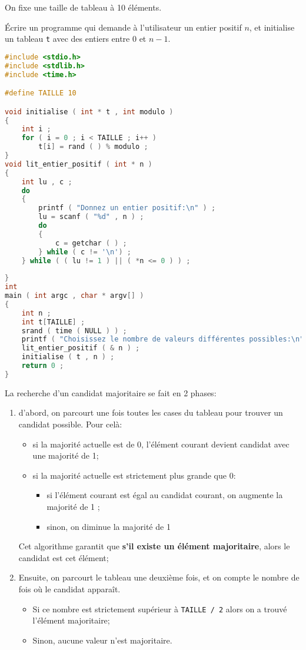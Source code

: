 On fixe une taille de tableau à 10 éléments.


\question Écrire un programme qui demande à l'utilisateur un entier
positif \(n\), et initialise un tableau \texttt{t} avec des entiers
entre \(0\) et \(n-1\).

\begin{solutioncachee}
  \begin{lstlisting}[language=C]
#include <stdio.h>
#include <stdlib.h>
#include <time.h>

#define TAILLE 10

void initialise ( int * t , int modulo )
{
    int i ;
    for ( i = 0 ; i < TAILLE ; i++ )
        t[i] = rand ( ) % modulo ;
}
void lit_entier_positif ( int * n )
{
    int lu , c ;
    do
    {
        printf ( "Donnez un entier positif:\n" ) ;
        lu = scanf ( "%d" , n ) ;
        do
        {
            c = getchar ( ) ;
        } while ( c != '\n') ;
    } while ( ( lu != 1 ) || ( *n <= 0 ) ) ;
    
}
int 
main ( int argc , char * argv[] )
{
    int n ;
    int t[TAILLE] ;
    srand ( time ( NULL ) ) ;
    printf ( "Choisissez le nombre de valeurs différentes possibles:\n" ) ;
    lit_entier_positif ( & n ) ;
    initialise ( t , n ) ;
    return 0 ;
}

  \end{lstlisting}
\end{solutioncachee}

La recherche d'un candidat majoritaire se fait en 2 phases:
\begin{enumerate}
\item d'abord, on parcourt une fois toutes les cases du tableau pour trouver
  un candidat possible. Pour celà:
  \begin{itemize}
  \item si la majorité actuelle est de 0, l'élément courant devient candidat avec une majorité de 1;
  \item si la majorité actuelle est strictement plus grande que 0:
    \begin{itemize}
    \item si l'élément courant est égal au candidat courant, on augmente la majorité de 1 ;
    \item sinon, on diminue la majorité de 1
    \end{itemize}
  \end{itemize}
  Cet algorithme garantit que \textbf{s'il existe un élément majoritaire}, alors le candidat est cet élément;
\item Ensuite, on parcourt le tableau une deuxième fois, et on compte
  le nombre de fois où le candidat apparaît.
  \begin{itemize}
  \item Si ce nombre est strictement supérieur à \texttt{TAILLE / 2}
    alors on a trouvé l'élément majoritaire;
  \item Sinon, aucune valeur n'est majoritaire.
  \end{itemize}
\end{enumerate}

